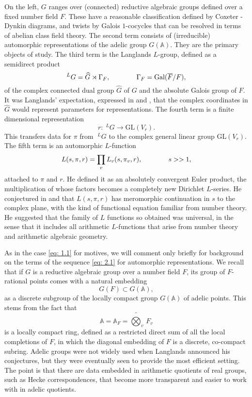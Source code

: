\documentclass[preprint,12pt, leqno]{elsarticle}
\newcommand{\mA}{\mathbb{A}}
\newcommand{\GL}{\mbox{GL}}
\newcommand{\LG}{\;^LG}
\newcommand{\whG}{\widehat{G}}
\newcommand{\SP}{\mkern70mu }
\numberwithin{equation}{section}
\theoremstyle{named}
\begin{document}
On the left, $G$ ranges over (connected) reductive algebraic groups defined over a fixed number field $F$. These have a reasonable classification defined by Coxeter - Dynkin diagrams, and twists by Galois $1$-cocycles that can be resolved in terms of abelian class field theory. The second term consists of (irreducible) automorphic representations of the adelic group $G(\mA)$. They are the primary objects of study. The third term is the Langlands $L$-group, defined as a semidirect product
\begin{equation*}
    ^LG = \widehat{G}\rtimes \Gamma_{F},\mkern70mu \Gamma_F = \mbox{Gal}(\overline{F}/F),
\end{equation*}
of the complex connected dual group $\whG$ of $G$ and the absolute Galois group of $F$. It was Langlands' expectation, expressed in \cite{N6} and \cite{L2}, that the complex coordinates in $\whG$ would represent parameters for representations. The fourth term is a finite dimensional representation
\begin{equation*}
    r:\LG \longrightarrow\GL(V_r).
\end{equation*}
This transfers data for $\pi$ from $\LG$ to the complex general linear group $\GL(V_r)$. The fifth term is an automorphic $L$-function
\begin{equation}\label{eq: 2.2}
    L(s, \pi, r) = \prod_v L_v(s, \pi_v, r), \SP  s>>1,
\end{equation}
attached to $\pi$ and $r$. He defined it as an absolutely convergent Euler product, the multiplication of whose factors becomes a completely new Dirichlet $L$-series. He conjectured in \cite{N6} and \cite{L2} that $L(s, \pi, r)$ has meromorphic continuation in $s$ to the complex plane, with the kind of functional equation familiar from number theory. He suggested that the family of $L$ functions so obtained was universal, in the sense that it includes all arithmetic $L$-functions that arise from number theory and arithmetic algebraic geometry.

As in the case \eqref{eq: 1.1} for motives, we will comment only briefly for background on the terms of the sequence \eqref{eq: 2.1} for automorphic representations. We recall that if $G$ is a reductive algebraic group over a number field $F$, its group of $F$-rational points comes with a natural embedding
\begin{equation*}
    G(F) \subset G(\mA),
\end{equation*}
as a discrete subgroup of the locally compact group $G(\mA)$ of adelic points. This stems from the fact that
\begin{equation*}
    \mA = \mA_F = \displaystyle\widetilde{\bigotimes_v}\, F_v
\end{equation*}
is a locally compact ring, defined as a restricted direct sum of all the local completions of $F$, in which the diagonal embedding of $F$ is a discrete, co-compact subring. Adelic groups were not widely used when Langlands announced his conjectures, but they were eventually seen to provide the most efficient setting. The point is that there are data embedded in arithmetic quotients of real groups, such as Hecke correspondences, that become more transparent and easier to work with in adelic quotients.
\end{document}
